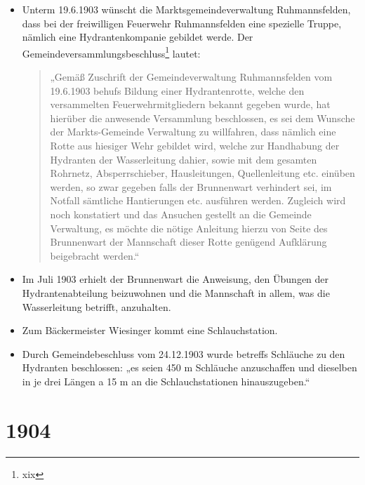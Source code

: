 \documentclass[12pt,a4paper]{book}
\begin{document}
\begin{itemize}
\item Unterm 19.6.1903 wünscht die Marktsgemeindeverwaltung
Ruhmannsfelden, dass bei der freiwilligen Feuerwehr Ruhmannsfelden eine
spezielle Truppe, nämlich eine Hydrantenkompanie gebildet werde. Der
Gemeindeversammlungsbeschluss\footnote{xix} lautet:

\begin{quote}
„Gemäß Zuschrift der Gemeindeverwaltung Ruhmannsfelden vom 19.6.1903
behufs Bildung einer Hydrantenrotte, welche den versammelten
Feuerwehrmitgliedern bekannt gegeben wurde, hat hierüber die anwesende
Versammlung beschlossen, es sei dem Wunsche der Markts-Gemeinde
Verwaltung zu willfahren, dass nämlich eine Rotte aus hiesiger Wehr
gebildet wird, welche zur Handhabung der Hydranten der Wasserleitung
dahier, sowie mit dem gesamten Rohrnetz, Absperrschieber, Hausleitungen,
Quellenleitung etc. einüben werden, so zwar gegeben falls der
Brunnenwart verhindert sei, im Notfall sämtliche Hantierungen etc.
ausführen werden. Zugleich wird noch konstatiert und das Ansuchen
gestellt an die Gemeinde Verwaltung, es möchte die nötige Anleitung
hierzu von Seite des Brunnenwart der Mannschaft dieser Rotte genügend
Aufklärung beigebracht werden.“
\end{quote}

\item Im Juli 1903 erhielt der Brunnenwart die Anweisung, den Übungen
der Hydrantenabteilung beizuwohnen und die Mannschaft in allem, was die
Wasserleitung betrifft, anzuhalten.

\item Zum Bäckermeister Wiesinger kommt eine Schlauchstation.

\item Durch Gemeindebeschluss vom 24.12.1903 wurde betreffs Schläuche zu
den Hydranten beschlossen: „es seien 450 m Schläuche anzuschaffen und
dieselben in je drei Längen a 15 m an die Schlauchstationen
hinauszugeben.“
\end{itemize}

\section*{1904}
\end{document}
